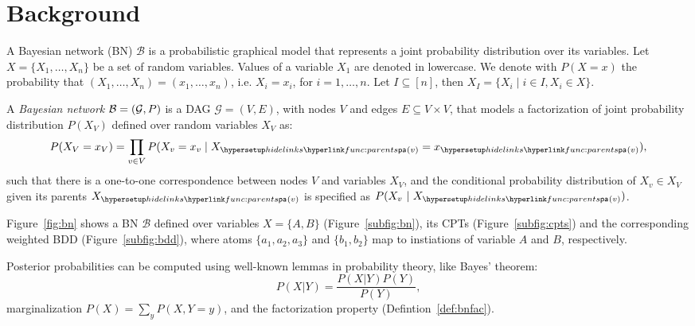 
\section{Background}
\label{sec:background}

A Bayesian network (BN) $\mathcal{B}$ is a probabilistic graphical model that represents a joint probability distribution over its variables. Let $X = \{X_1,\ldots,X_n\}$ be a set of random variables.
Values of a variable $X_1$ are denoted in lowercase.
We denote with $P(X = x)$ the probability that $(X_1,\ldots,X_n) = (x_1,\ldots,x_n)$,
i.e. $X_i = x_i$, for $i =1,\ldots,n$.
Let  $I \subseteq [n]$, then $X_I = \{X_i \mid i \in I, X_i \in X\}$. %

\begin{definition}\label{def:bnfac}
    \ULforem
    A \emph{Bayesian network} $\mathcal{B} = \left( \mathcal{G},P \right)$ is a DAG $\mathcal{G} = (V,E)$, with nodes $V$ and edges $E \subseteq V \times V$, that models a factorization of joint probability distribution $P(X_V)$ defined over random variables $X_V$ as:%
    \begin{equation}
    P(X_V = x_V) = \prod_{v \in V}P(X_v = x_v \mid X_{\myparents(v)}= x_{\myparents(v)}),
    \end{equation}%
    \noindent such that there is a one-to-one correspondence between nodes $V$ and variables $X_V$, and the conditional probability distribution of $X_v \in X_V$ given its parents $X_{\myparents(v)}$ is specified as $P(X_v\ |\ X_{\myparents(v)})$.

\end{definition}

\begin{example}\label{ex:full}\label{ex:bn}
 Figure~\ref{fig:bn} shows a BN $\mathcal{B}$ defined over variables $X = \{A,B\}$ (Figure~\ref{subfig:bn}), its CPTs (Figure~\ref{subfig:cpts}) and the corresponding weighted BDD (Figure~\ref{subfig:bdd}), where atoms $\{a_1,a_2,a_3\}$ and $\{b_1,b_2\}$ map to instiations of variable $A$ and $B$, respectively.
 \vspace{-2em}

\end{example}

Posterior probabilities can be computed using well-known lemmas in probability theory, like Bayes’ theorem:
\[P(X | Y) = \frac{P(X | Y)P(Y)}{P(Y)},\]
marginalization $P(X) = \sum_{y} P(X, Y = y)$, and the factorization property (Defintion~\ref{def:bnfac}).


